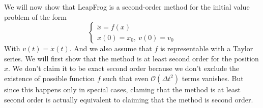 \documentclass{article}
\begin{document}
We will now show that LeapFrog is a second-order method for the initial value problem of the form
\[\begin{cases}
	\ddot{x}=f(x)\\
	x(0)=x_0,~v(0)=v_0
\end{cases}\]
With $v(t)=\dot{x}(t)$. And we also assume that $f$ is representable with a Taylor series. 
We will first show that the method is at least second order for the position $x$. We don't claim it to be exact second order because we don't exclude the existence of possible function $f$ such that even $\mathcal{O}(\Delta t^2)$ terms vanishes. But since this happens only in special cases, claming that the method is at least second order is actually equivalent to claiming that the method is second order.\\
\end{document}
